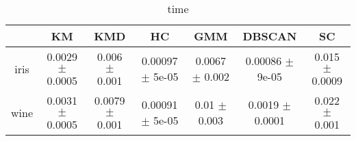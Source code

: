 \begin{table}
\centering
\begin{tabular}{ccccccc}
\toprule
 & KM & KMD & HC & GMM & DBSCAN & SC \\
\midrule
iris & 0.0029 $\pm$ 0.0005 & 0.006 $\pm$ 0.001 & 0.00097 $\pm$ 5e-05 & 0.0067 $\pm$ 0.002 & 0.00086 $\pm$ 9e-05 & 0.015 $\pm$ 0.0009 \\
wine & 0.0031 $\pm$ 0.0005 & 0.0079 $\pm$ 0.001 & 0.00091 $\pm$ 5e-05 & 0.01 $\pm$ 0.003 & 0.0019 $\pm$ 0.0001 & 0.022 $\pm$ 0.001 \\
\bottomrule
\end{tabular}
\caption{time}
\label{table:time}
\end{table}
